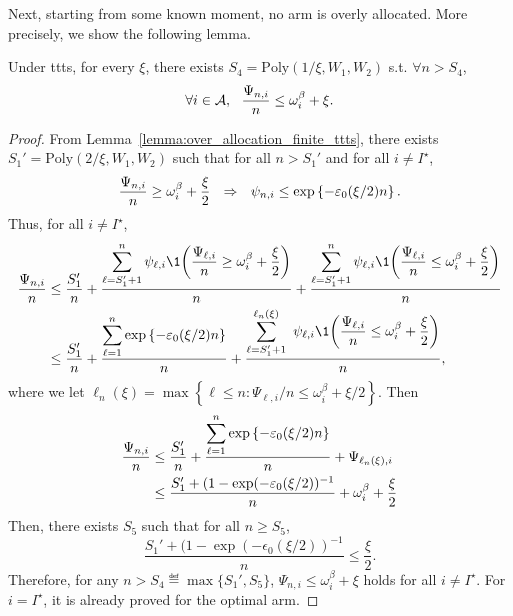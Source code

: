 Next, starting from some known moment, no arm is overly allocated. More precisely, we show the following lemma.

\begin{lemma}\label{lemma:psi_other_ttts}
\begin{leftbar}[lemmabar]
    Under \gls{ttts}, for every $\xi$, there exists $S_4 = \text{Poly}(1/\xi,W_1,W_2)$ s.t. $\forall n > S_4$,
    \[
        \forall i \in \mathcal{A}, \ \ \frac{\Psi_{n,i}}{n} \leq \omega_{i}^\beta + \xi.
    \]
\end{leftbar}
\end{lemma}

\begin{proof}
    From Lemma~\ref{lemma:over_allocation_finite_ttts}, there exists $S_1' = \text{Poly}(2/\xi,W_1,W_2)$ such that for all $n > S_1'$ and for all $i\neq I^\star$, 
    \[
        \frac{\Psi_{n,i}}{n} \geq \omega_{i}^\beta + \frac{\xi}{2}  \ \ \Rightarrow \ \ \psi_{n,i} \leq \exp\left\{-\varepsilon_0(\xi/2) n\right\}.
    \] 
    Thus, for all $i \neq I^\star$,
    \begin{align*}
        \frac{\Psi_{n,i}}{n} 
        &\leq \frac{S_1'}{n} + \ddfrac{\sum_{\ell=S_1'+1}^n \psi_{\ell,i}\1{\left(\frac{\Psi_{\ell,i}}{n} \geq \omega_{i}^\beta+\frac{\xi}{2}\right)}}{n} + \ddfrac{\sum_{\ell=S_1'+1}^n \psi_{\ell,i}\1{\left(\frac{\Psi_{\ell,i}}{n} \leq \omega_{i}^\beta + \frac{\xi}{2}\right)}}{n} \\
        &\leq \frac{S_1'}{n} + \ddfrac{\sum_{\ell=1}^n \expp{-\epsilon_0(\xi/2) n}}{n} + \ddfrac{\sum_{\ell=S_1'+1}^{\ell_n(\xi)}\ \psi_{\ell,i}\1{\left(\frac{\Psi_{\ell,i}}{n} \leq \omega_{i}^\beta + \frac{\xi}{2}\right)}}{n},
    \end{align*}
    where we let $\ell_n(\xi) = \max\left\{ \ell \leq n : \Psi_{\ell,i}/n \leq \omega_{i}^\beta + \xi/2\right\}$. Then
    \begin{align*}
        \frac{\Psi_{n,i}}{n} 
        &\leq \frac{S_1'}{n} + \frac{\displaystyle \sum_{\ell=1}^n \exp\left\{-\varepsilon_0(\xi/2) n\right\}}{\displaystyle n} + \Psi_{\ell_n(\xi),i}\\
        &\leq \frac{S_1' + (1 - \exp(-\varepsilon_0(\xi/2))^{-1}}{n}+ \omega_{i}^\beta + \frac{\xi}{2}
    \end{align*}
    Then, there exists $S_5$ such that for all $n \geq S_5$,
    \[
        \frac{S_1' + (1 - \exp(-\epsilon_0(\xi/2))^{-1}}{n} \leq \frac{\xi}{2}.
    \]
    Therefore, for any $n > S_4 \eqdef \max\{S_1',S_5\}$, $\Psi_{n,i} \leq \omega_i^\beta + \xi$ holds for all $i\neq I^\star$. For $i = I^\star$, it is already proved for the optimal arm.
\end{proof}

